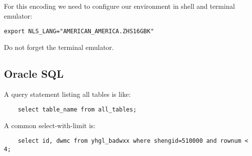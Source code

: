 For this encoding we need to configure our environment in shell and terminal emulator:
\begin{verbatim}
export NLS_LANG="AMERICAN_AMERICA.ZHS16GBK"
\end{verbatim}

Do not forget the terminal emulator.


\subsection{Oracle SQL}

A query statement listing all tables is like:
\begin{verbatim}
    select table_name from all_tables;
\end{verbatim}

A common select-with-limit is:
\begin{verbatim}
    select id, dwmc from yhgl_badwxx where shengid=510000 and rownum < 4;
\end{verbatim}
